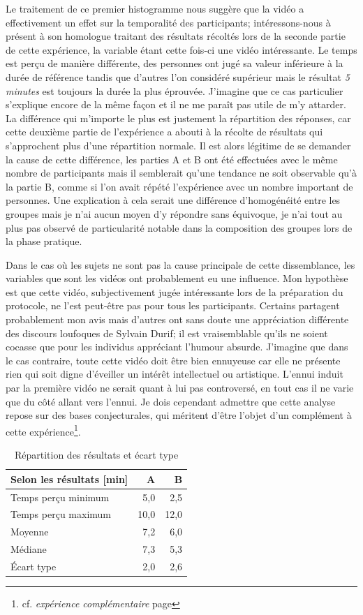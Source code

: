 \documentclass[12pt,fleqn,oneside,french,openany]{book} %
\begin{document}
Le traitement de ce premier histogramme nous suggère que la vidéo a effectivement un effet sur la temporalité des participants; intéressons-nous à présent à son homologue traitant des résultats récoltés lors de la seconde partie de cette expérience, la variable étant cette fois-ci une vidéo intéressante. Le temps est perçu de manière différente, des personnes ont jugé sa valeur inférieure à la durée de référence tandis que d'autres l'on considéré supérieur mais le résultat \emph{5 minutes} est toujours la durée la plus éprouvée. J'imagine que ce cas particulier s'explique encore de la même façon et il ne me paraît pas utile de m'y attarder. La différence qui m'importe le plus est justement la répartition des réponses, car cette deuxième partie de l'expérience a abouti à la récolte de résultats qui s'approchent plus d'une répartition normale. Il est alors légitime de se demander la cause de cette différence, les parties A et B ont été effectuées avec le même nombre de participants mais il semblerait qu'une tendance ne soit observable qu'à la partie B, comme si l'on avait répété l'expérience avec un nombre important de personnes. Une explication à cela serait une différence d'homogénéité entre les groupes mais je n'ai aucun moyen d'y répondre sans équivoque, je n'ai tout au plus pas observé de particularité notable dans la composition des groupes lors de la phase pratique. 

Dans le cas où les sujets ne sont pas la cause principale de cette dissemblance, les variables que sont les vidéos ont probablement eu une influence. Mon hypothèse est que cette vidéo, subjectivement jugée intéressante lors de la préparation du protocole, ne l'est peut-être pas pour tous les participants. Certains partagent probablement mon avis mais d'autres ont sans doute une appréciation différente des discours loufoques de Sylvain Durif; il est vraisemblable qu'ils ne soient cocasse que pour les individus appréciant l'humour absurde. J'imagine que dans le cas contraire, toute cette vidéo doit être bien ennuyeuse car elle ne présente rien qui soit digne d'éveiller un intérêt intellectuel ou artistique. L'ennui induit par la première vidéo ne serait quant à lui pas controversé, en tout cas il ne varie que du côté allant vers l'ennui. Je dois cependant admettre que cette analyse repose sur des bases conjecturales, qui méritent d'être l'objet d'un complément à cette expérience\footnote{cf. \emph{expérience complémentaire} page \pageref{ssec:exp1.2}}. 

\begin{table}[h!]
	\centering
	\caption{Répartition des résultats et écart type} \label{tbl:analyse1.1}
	\begin{tabular}{lrr}
		\toprule 
		\textbf{Selon les résultats [min]} & \textbf{A} & \textbf{B} \\ \midrule
		Temps perçu minimum & 5,0 & 2,5 \\ 
		Temps perçu maximum & 10,0 & 12,0 \\
		Moyenne & 7,2 & 6,0 \\
		Médiane & 7,3 & 5,3 \\
		Écart type & 2,0 & 2,6 \\ \bottomrule
	\end{tabular}
\end{table}
\end{document}

